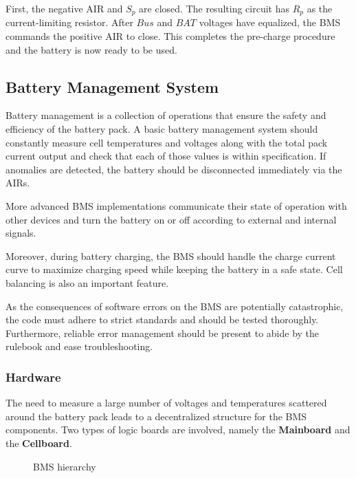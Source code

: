 First, the negative AIR and $S_p$ are closed. The resulting circuit has $R_p$ as the current-limiting resistor. After $Bus$ and $BAT$ voltages have equalized, the BMS commands the positive AIR to close. This completes the pre-charge procedure and the battery is now ready to be used.

\subsection{Battery Management System}
Battery management is a collection of operations that ensure the safety and efficiency of the battery pack. A basic battery management system should constantly measure cell temperatures and voltages along with the total pack current output and check that each of those values is within specification. If anomalies are detected, the battery should be disconnected immediately via the AIRs.
%    

More advanced BMS implementations communicate their state of operation with other devices and turn the battery on or off according to external and internal signals.

Moreover, during battery charging, the BMS should handle the charge current curve to maximize charging speed while keeping the battery in a safe state. Cell balancing is also an important feature.

As the consequences of software errors on the BMS are potentially catastrophic, the code must adhere to strict standards and should be tested thoroughly. Furthermore, reliable error management should be present to abide by the rulebook and ease troubleshooting.

\subsubsection{Hardware}
The need to measure a large number of voltages and temperatures scattered around the battery pack leads to a decentralized structure for the BMS components. Two types of logic boards are involved, namely the \textbf{Mainboard} and the \textbf{Cellboard}.

\begin{figure}[h]
    \centering
    
    \caption{BMS hierarchy}
    \label{fig:bms_hierarchy}
\end{figure}

